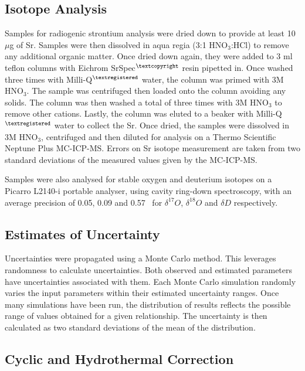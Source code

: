 \subsection{Isotope Analysis}

Samples for radiogenic strontium analysis were dried down to provide at least 10 $\mu$g of Sr. Samples were then dissolved in aqua regia (3:1 HNO$_3$:HCl) to remove any additional organic matter. Once dried down again, they were added to 3 ml teflon columns with Eichrom SrSpec$^{\textcopyright}$ resin pipetted in. Once washed three times with Milli-Q$^{\textregistered}$ water, the column was primed with 3M HNO$_3$. The sample was centrifuged then loaded onto the column avoiding any solids. The column was then washed a total of three times with 3M HNO$_3$ to remove other cations. Lastly, the column was eluted to a beaker with Milli-Q$^{\textregistered}$ water to collect the Sr. Once dried, the samples were dissolved in 3M HNO$_3$, centrifuged and then diluted for analysis on a Thermo Scientific Neptune Plus MC-ICP-MS. Errors on Sr isotope measurement are taken from two standard deviations of the measured values given by the MC-ICP-MS.

\bsk

Samples were also analysed for stable oxygen and deuterium isotopes on a Picarro L2140-i portable analyser, using cavity ring-down spectroscopy, with an average precision of 0.05, 0.09 and 0.57 \textperthousand\ for $\delta^{17}O$, $\delta^{18}O$ and $\delta D$ respectively. 


\subsection{Estimates of Uncertainty}

Uncertainties were propagated using a Monte Carlo method. This leverages randomness to calculate uncertainties. Both observed and estimated parameters have uncertainties associated with them. Each Monte Carlo simulation randomly varies the input parameters within their estimated uncertainty ranges. Once many simulations have been run, the distribution of results reflects the possible range of values obtained for a given relationship. The uncertainty is then calculated as two standard deviations of the mean of the distribution.


\subsection{Cyclic and Hydrothermal Correction}

